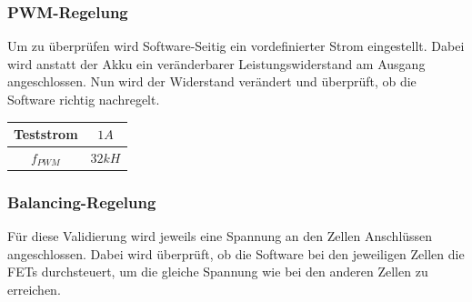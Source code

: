 \subsubsection*{PWM-Regelung}
Um zu überprüfen wird Software-Seitig ein vordefinierter Strom eingestellt. Dabei wird anstatt der Akku ein veränderbarer Leistungswiderstand am Ausgang angeschlossen. Nun wird der Widerstand verändert und überprüft, ob die Software richtig nachregelt.
\begin{center}
	\begin{tabular}{|c|c|}
		\hline 
		Teststrom & $1A$ \\ \hline
		${f}_{PWM}$ & $32kH$ \\ \hline
	\end{tabular} 
	\label{tab:LadestromHighsideDriver}
\end{center}


\subsubsection{Balancing-Regelung}
Für diese Validierung wird jeweils eine Spannung an den Zellen Anschlüssen angeschlossen. Dabei wird überprüft, ob die Software bei den jeweiligen Zellen die FETs durchsteuert, um  die gleiche Spannung wie bei den anderen Zellen zu erreichen.




